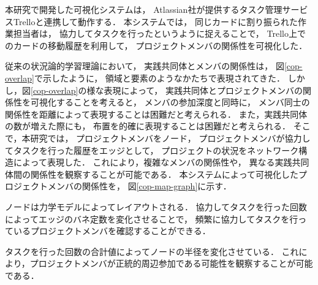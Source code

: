 

本研究で開発した可視化システムは，
Atlassian社が提供するタスク管理サービスTrelloと連携して動作する．
本システムでは，
同じカードに割り振られた作業担当者は，
協力してタスクを行ったというように捉えることで，
Trello上でのカードの移動履歴を利用して，
プロジェクトメンバの関係性を可視化した．

従来の状況論的学習理論において，
実践共同体とメンバの関係性は，
図\ref{cop-overlap}で示したように，
領域と要素のようなかたちで表現されてきた．
しかし，図\ref{cop-overlap}の様な表現によって，
実践共同体とプロジェクトメンバの関係性を可視化することを考えると，
メンバの参加深度と同時に，
メンバ同士の関係性を距離によって表現することは困難だと考えられる．
また，実践共同体の数が増えた際にも，
布置を的確に表現することは困難だと考えられる．
そこで，本研究では，
プロジェクトメンバをノード，
プロジェクトメンバが協力してタスクを行った履歴をエッジとして，
プロジェクトの状況をネットワーク構造によって表現した．
これにより，複雑なメンバの関係性や，
異なる実践共同体間の関係性を観察することが可能である．
本システムによって可視化したプロジェクトメンバの関係性を，
図\ref{cop-map-graph}に示す．

ノードは力学モデルによってレイアウトされる．
協力してタスクを行った回数によってエッジのバネ定数を変化させることで，
頻繁に協力してタスクを行っているプロジェクトメンバを確認することができる．

タスクを行った回数の合計値によってノードの半径を変化させている．
これにより，プロジェクトメンバが正統的周辺参加である可能性を観察することが可能である．

